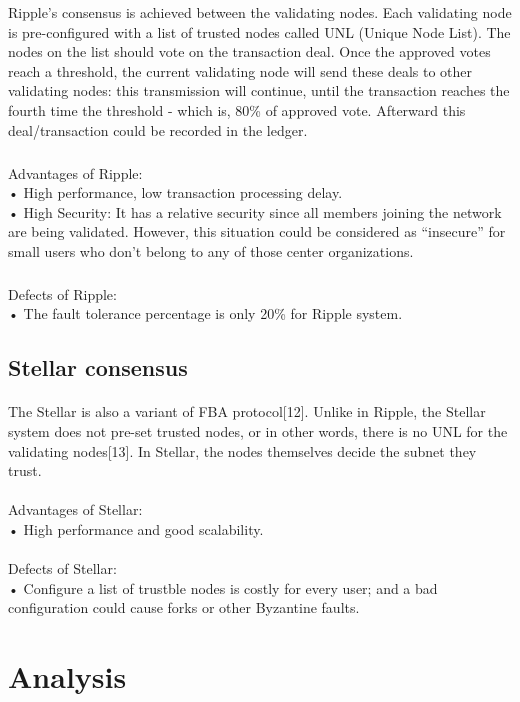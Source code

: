 \documentclass[]{article}
\begin{document}
\begin{CJK*}{UTF8}{gbsn}
Ripple's consensus is achieved between the validating nodes. Each validating node is pre-configured with a list of trusted nodes called UNL (Unique Node List). The nodes on the list should vote on the transaction deal. Once the approved votes reach a threshold, the current validating node will send these deals to other validating nodes: this transmission will continue, until the transaction reaches the fourth time the threshold - which is, 80\% of approved vote. Afterward this deal/transaction could be recorded in the ledger.
	
	\subparagraph{} 
Advantages of Ripple:
\\• High performance, low transaction processing delay.
\\• High Security: It has a relative security since all members joining the network are being validated. However, this situation could be considered as ``insecure'' for small users who don't belong to any of those center organizations.
	\subparagraph{} 
Defects of Ripple:	
\\• The fault tolerance percentage is only 20\% for Ripple system.

	
	\subsection{Stellar consensus}
	\paragraph{} 
	The Stellar is also a variant of FBA protocol[12]. Unlike in Ripple, the Stellar system does not pre-set trusted nodes, or in other words, there is no UNL for the validating nodes[13]. In Stellar, the nodes themselves decide the subnet they trust. 
	\paragraph{} 
Advantages of Stellar:
\\• High performance and good scalability.
	\paragraph{} 
Defects of Stellar:	
\\• Configure a list of trustble nodes is costly for every user; and a bad configuration could cause forks or other Byzantine faults.

\section{Analysis}


\end{CJK*}
\end{document}
